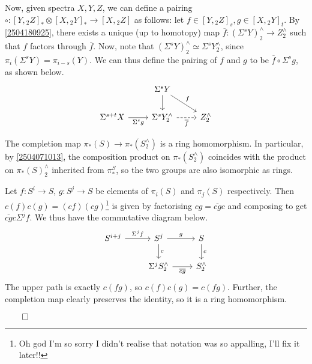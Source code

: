 \documentclass{MetricNotes2023}
\def\done{\begin{flushright}\vspace{-4.35ex}\(\qed\)\end{flushright}}
\begin{document}
Now, given spectra \(X, Y, Z\), we can define a pairing \(\circ : [Y, \text{}_2Z]_* \otimes [X,\text{}_2Y]_* \to [X, \text{}_2Z]\) as follows: let \(f \in [Y, \text{}_2Z]_s, g \in [X, \text{}_2Y]_t\). By \ref{2504180925}, there exists a unique (up to homotopy) map \(\overline f : (\Sigma^sY)^\wedge_2 \to Z^\wedge_2\) such that \(f\) factors through \(\overline f\). Now, note that \((\Sigma^sY)^\wedge_2 \simeq \Sigma^sY^\wedge_2\), since \(\pi_i(\Sigma^sY)=\pi_{i-s}(Y)\). We can thus define the pairing of \(f\) and \(g\) to be \(\overline f \circ \Sigma^s g\), as shown below. 
\[\begin{tikzcd}
 & \Sigma^sY \arrow[rd, "f"] \arrow[d, ""] & \\ 
 \Sigma^{s+t}X \arrow[r, swap, "\Sigma^sg"]  & \Sigma^sY^\wedge_2 \arrow[r, "\overline f"', dashrightarrow] & Z^\wedge_2 
 \end{tikzcd}\] 

\begin{lemma}
The completion map \(\pi_*(S) \to \pi_*(S^\wedge_2)\) is a ring homomorphism. In particular, by \ref{2504071013}, the composition product on \(\pi_*(S^\wedge_2)\) coincides with the product on \(\pi_*(S)^\wedge_2\) inherited from \(\pi_*^S\), so the two groups are also isomorphic as rings. 
\end{lemma}

\begin{ourproof}
Let \(f : S^i \to S\), \(g : S^j \to S\) be elements of \(\pi_i(S)\) and \(\pi_j(S)\) respectively. Then \(c(f)c(g)=(cf)(cg)\)\footnote{Oh god I'm so sorry I didn't realise that notation was so appalling, I'll fix it later!!} is given by factorising \(cg=\overline{cg}c\) and composing to get \(\overline{cg}c\Sigma^jf\). We thus have the commutative diagram below.
\[\begin{tikzcd}
S^{i+j} \arrow[r, "\Sigma^j f"]  & S^j \arrow[r, "g"] \arrow[d, "c"] & S \arrow[d, "c"] \\ 
 & \Sigma^jS^\wedge_2  \arrow[r, "\overline{cg}"'] & S^\wedge_2 
 \end{tikzcd}\] 
The upper path is exactly \(c(fg)\), so \(c(f)c(g)=c(fg)\). Further, the completion map clearly preserves the identity, so it is a ring homomorphism.\done
\end{ourproof}
\end{document}
